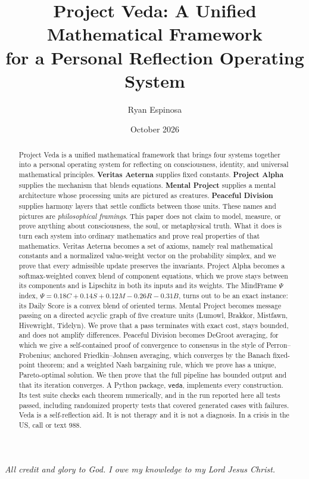 \documentclass[11pt]{article}
\title{\textbf{Project Veda: A Unified Mathematical Framework\\ for a Personal Reflection Operating System}}
\author{Ryan Espinosa}
\date{October 2026}
\theoremstyle{definition}
\theoremstyle{remark}
\begin{document}
\maketitle

\begin{center}
\emph{All credit and glory to God. I owe my knowledge to my Lord Jesus Christ.}
\end{center}
\vspace{4pt}

\begin{abstract}
\noindent Project Veda is a unified mathematical framework that brings four systems together into a personal operating system for reflecting on consciousness, identity, and universal mathematical principles. \textbf{Veritas Aeterna} supplies fixed constants. \textbf{Project Alpha} supplies the mechanism that blends equations. \textbf{Mental Project} supplies a mental architecture whose processing units are pictured as creatures. \textbf{Peaceful Division} supplies harmony layers that settle conflicts between those units. These names and pictures are \emph{philosophical framings}. This paper does not claim to model, measure, or prove anything about consciousness, the soul, or metaphysical truth. What it does is turn each system into ordinary mathematics and prove real properties of that mathematics. Veritas Aeterna becomes a set of axioms, namely real mathematical constants and a normalized value-weight vector on the probability simplex, and we prove that every admissible update preserves the invariants. Project Alpha becomes a softmax-weighted convex blend of component equations, which we prove stays between its components and is Lipschitz in both its inputs and its weights. The MindFrame $\Psi$ index, $\Psi = 0.18C + 0.14S + 0.12M - 0.26R - 0.31B$, turns out to be an exact instance: its Daily Score is a convex blend of oriented terms. Mental Project becomes message passing on a directed acyclic graph of five creature units (Lumowl, Brakkor, Mistfawn, Hivewright, Tidelyn). We prove that a pass terminates with exact cost, stays bounded, and does not amplify differences. Peaceful Division becomes DeGroot averaging, for which we give a self-contained proof of convergence to consensus in the style of Perron--Frobenius; anchored Friedkin--Johnsen averaging, which converges by the Banach fixed-point theorem; and a weighted Nash bargaining rule, which we prove has a unique, Pareto-optimal solution. We then prove that the full pipeline has bounded output and that its iteration converges. A Python package, \texttt{veda}, implements every construction. Its test suite checks each theorem numerically, and in the run reported here all \Npassed{} tests passed, including \Nprop{} randomized property tests that covered \Ncases{} generated cases with \Ncasefail{} failures. Veda is a self-reflection aid. It is not therapy and it is not a diagnosis. In a crisis in the US, call or text 988.
\end{abstract}
\end{document}
